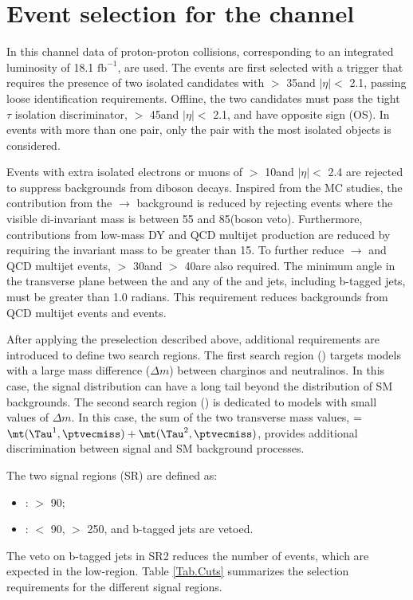 \section{\texorpdfstring{Event selection for the \tauTau channel}{Event selection for the tau-tau channel}}
\label{sect:tauTauCuts}
In this channel data of proton-proton collisions,  corresponding to an integrated luminosity of 18.1 $\mathrm{fb}^{-1}$, are used.
The events are first selected with a trigger \cite{Chatrchyan:2011nv} that requires the presence of two isolated 
\Tau candidates with \PT $>$ 35\GeV and $|\eta|<$ 2.1, passing loose identification requirements.
Offline, the two \Tau candidates must pass the tight $\tau$ isolation discriminator,
\PT $>$ 45\GeV and $|\eta|<$ 2.1, and have opposite sign (OS).
In events with more than one \tauTau pair, only the pair with the most isolated \Tau objects is considered. 

Events with extra isolated electrons or muons of \PT $>$ 10\GeV and $|\eta| <$ 2.4 
are rejected to suppress backgrounds from diboson decays. 
Inspired from the MC studies, 
the contribution from the \Z$ \rightarrow$ \tauTau  background is reduced by rejecting events 
where the visible di-\Tau invariant mass is between 55 and 85\GeV (\Z boson veto).  
Furthermore, contributions from low-mass DY and QCD multijet production are 
reduced by requiring the invariant mass to be greater than 15\GeV.
To further reduce \Z $\rightarrow$ \tauTau and QCD multijet events, 
\MPT $>$ 30\GeV and \mttwo $>$ 40\GeV are also required.
The minimum angle \deltaphi in the transverse plane between the \ptvecmiss and any of the \Tau and jets, 
including b-tagged jets, must be greater than 1.0 radians. 
This requirement reduces backgrounds from QCD multijet events and \wjets events.

After applying the preselection described above,
additional requirements are introduced to define two search regions.
The first search region (\binone) targets models with a large mass difference ($\Delta m$) 
between charginos and neutralinos.
In this case, the \mttwo signal distribution can have a long tail beyond the 
distribution of SM backgrounds.
The second search region (\bintwo) is dedicated to models with small values of $\Delta m$.
In this case, the sum of the two transverse mass values, \SumMT = $\mt(\Tau^1,\ptvecmiss) + \mt(\Tau^2,\ptvecmiss)$, 
provides additional discrimination between signal and SM background processes.

The two signal regions (SR) are defined as:
\begin{itemize}
\item {\bf \binone}: \mttwo $>$ 90\GeV;
\item {\bf \bintwo}:  \mttwo $<$ 90\GeV, \SumMT $>$ 250\GeV, and b-tagged jets are vetoed.
\end{itemize}
The veto on b-tagged jets in SR2 reduces the
number of \ttbar events, which
are expected in  the low-\mttwo region. Table \ref{Tab.Cuts} summarizes the selection requirements for the different signal regions.
